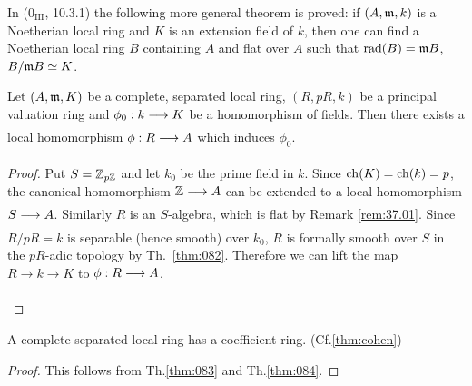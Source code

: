 \documentclass[../main]{subfiles}
\begin{document}
\begin{remark}
\label{rem:37.02}
    In \cite{egaIII1} ($0_{\mathrm{III}}$, 10.3.1) the following more general theorem is proved: if $(A,\mathfrak{m},k)$ is a Noetherian local ring and $K$ is an extension field of $k$, then one can find a Noetherian local ring $B$ containing $A$ and flat over $A$ such that $\operatorname{rad}(B) = \mathfrak{m}B$, $B/\mathfrak{m}B \simeq K$.
\end{remark}
\begin{theorem}
\label{thm:084}
    Let $(A,\mathfrak{m},K)$ be a complete, separated local ring, $(R,pR,k)$ be a principal valuation ring and $\phi_0: k\varrightarrow{} K$ be a homomorphism of fields. Then there exists a local homomorphism $\phi: R \varrightarrow{} A$ which induces $\phi_0$.
\end{theorem}
\begin{proof}
    Put $S = \mathbb{Z}_{p\mathbb{Z}}$ and let $k_0$ be the prime field in $k$. Since $\operatorname{ch}(K) = \operatorname{ch}(k) = p$, the canonical homomorphism $\bZ \varrightarrow{} A$ can be extended to a local homomorphism $S\varrightarrow{} A$. Similarly $R$ is an $S$-algebra, which is flat by Remark \ref{rem:37.01}. Since $R/pR = k$ is separable (hence smooth) over $k_0$, $R$ is formally smooth over $S$ in the $pR$-adic topology by Th.~\ref{thm:082}. Therefore we can lift the map $R\longrightarrow k\longrightarrow K$ to $\phi: R\varrightarrow{}A$. 
    \begin{center}
    \end{center}
\end{proof}

\begin{theorem}
\label{thm:085}
    A complete separated local ring has a coefficient ring. (Cf.\ref{thm:cohen})
\end{theorem}
\begin{proof}
    This follows from Th.\ref{thm:083} and Th.\ref{thm:084}.
\end{proof}
\end{document}
